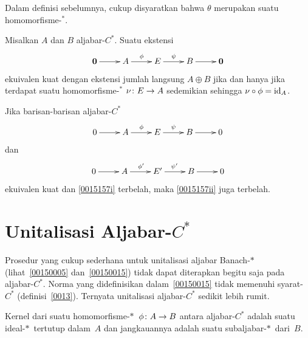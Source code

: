 \begin{prop}\label{0015152} Dalam definisi sebelumnya, cukup disyaratkan bahwa $\theta$
merupakan suatu homomorfisme-${}^*$.
\end{prop}

\begin{prop}\label{0015155} Misalkan $A$ dan $B$ aljabar-$C^*$. Suatu ekstensi
 \[\xymatrix{
     \vc 0\ar[r] & A\ar[r]^\phi & E\ar[r]^\psi & B\ar[r] & \vc 0
 }\]
ekuivalen kuat dengan ekstensi jumlah langsung $A \oplus B$ jika dan hanya jika terdapat\newline
suatu \mbox{homomorfisme-${}^*$} $\nu\colon E \rightarrow A$ sedemikian sehingga
$\nu\circ\phi = \operatorname{id}_{A}$.
\end{prop}

\begin{prop}\label{0015157} Jika barisan-barisan aljabar-$C^*$
 \begin{equation}\label{0015157i}\xymatrix{
     0\ar[r] & A\ar[r]^\phi & E\ar[r]^\psi & B\ar[r] & 0
 }\end{equation}
dan
 \begin{equation}\label{0015157ii}\xymatrix{
     0\ar[r] & A\ar[r]^{\phi'} & E'\ar[r]^{\psi'} & B\ar[r] & 0
 }\end{equation}
ekuivalen kuat dan \eqref{0015157i} terbelah, maka \eqref{0015157ii} juga terbelah.
\end{prop}

















\section{Unitalisasi Aljabar-$C^*$}
Prosedur yang cukup sederhana untuk unitalisasi aljabar Banach-$*\,$
(lihat~\ref{00150005} dan~\ref{00150015}) tidak dapat diterapkan begitu saja pada
aljabar-$C^*$. Norma yang didefinisikan dalam~\ref{00150015} tidak memenuhi syarat-$C^*$
(definisi~\ref{0013}). Ternyata unitalisasi aljabar-$C^*$ sedikit lebih rumit.

\begin{prop} Kernel dari suatu homomorfisme-$*\,$ $\phi\colon A \rightarrow B$ antara
aljabar-$C^*$ adalah suatu ideal-$*\,$ tertutup dalam~$A$ dan jangkauannya adalah suatu
subaljabar-$*\,$ dari~$B$.
\end{prop}

